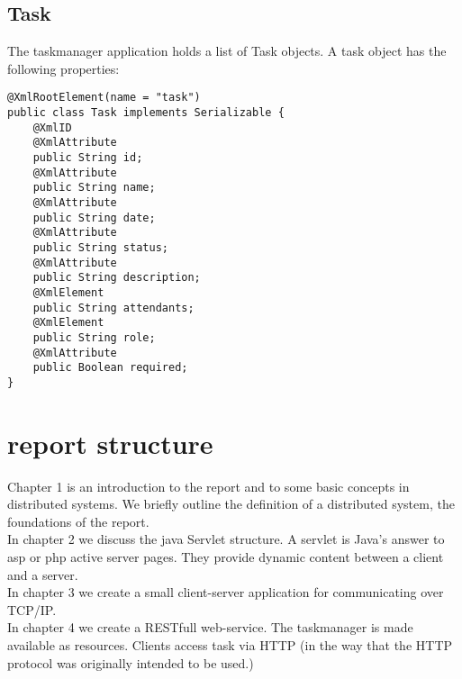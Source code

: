 \subsection{Task}
The taskmanager application holds a list of Task objects. A task object has the following properties:\\

\begin{comment}
ID (a unique identifier), name (the name of the task), date (the date of creation), status (status of the task. E.g executed or non-executed.),
required (E.g. ?true? or ?false?.?), role (role, is an access control technique in where the role of a task signifies the access rights level of that task. ), Attendants (a list of attendants for the task)\\
\end{comment}


\begin{lstlisting}[caption=Task]
@XmlRootElement(name = "task")
public class Task implements Serializable {
    @XmlID
    @XmlAttribute
    public String id;
    @XmlAttribute
    public String name;
    @XmlAttribute
    public String date;
    @XmlAttribute
    public String status;
    @XmlAttribute
    public String description;
    @XmlElement
    public String attendants;
    @XmlElement
    public String role;
    @XmlAttribute
    public Boolean required;
}

\end{lstlisting}

\section{report structure}

Chapter 1 is an introduction to the report and to some basic concepts in distributed systems. We briefly outline the definition of a distributed system, the foundations of the report. \\

In chapter 2 we discuss the java Servlet structure. A servlet is Java's answer to asp or php active server pages. They provide dynamic content between a client and a server. \\ 

In chapter 3 we create a small client-server application for communicating over TCP/IP. \\

In chapter 4 we create a RESTfull web-service. The taskmanager is made available as resources. 
Clients access task via HTTP (in the way that the HTTP protocol was originally intended to be used.) \\

